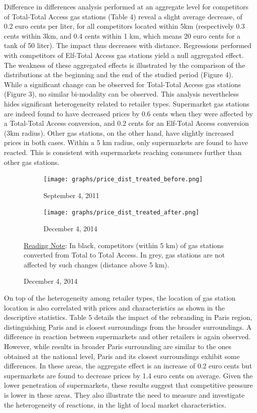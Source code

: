 \documentclass[english]{article}
\begin{document}
Difference in differences analysis performed at an aggregate level for competitors of Total-Total Access gas stations (Table 4) reveal a slight average decrease, of 0.2 euro cents per liter, for all competitors located within 5km (respectively 0.3 cents within 3km, and 0.4 cents within 1 km, which means 20 euro cents for a tank of 50 liter). The impact thus decreases with distance. Regressions performed with competitors of Elf-Total Access gas stations yield a null aggregated effect. The weakness of these aggregated effects is illustrated by the comparison of the distributions at the beginning and the end of the studied period (Figure 4). While a significant change can be observed for Total-Total Access gas stations (Figure 3), no similar bi-modality can be observed. This analysis nevertheless hides significant heterogeneity related to retailer types. Supermarket gas stations are indeed found to have decreased prices by 0.6 cents when they were affected by a Total-Total Access conversion, and 0.2 cents for an Elf-Total Access conversion (3km radius). Other gas stations, on the other hand, have slightly increased prices in both cases. Within a 5 km radius, only supermarkets are found to have reacted. This is consistent with supermarkets reaching consumers further than other gas stations.

\begin{figure}[htb!]
\centering
\caption{Distributions of Total Access competitor prices vs .others}
\label{fig:price_dist_total_comp_ba}
\begin{subfigure}{.49\textwidth}
\centering
\texttt{[image: graphs/price\_dist\_treated\_before.png]}
\caption[short]{September 4, 2011}
\end{subfigure}
\begin{subfigure}{.49\textwidth}
\centering
\texttt{[image: graphs/price\_dist\_treated\_after.png]}
\caption[short]{December 4, 2014}
\end{subfigure}
\flushleft
{\small{}\uline{Reading Note}}{\small{}: In black, competitors (within 5 km) of gas stations converted from Total to Total Access. In grey, gas stations are not affected by such changes (distance above 5 km).}{\small \par}
\end{figure}

On top of the heterogeneity among retailer types, the location of gas station location is also correlated with prices and characteristics as shown in the descriptive statistics. Table 5 details the impact of the rebranding in Paris region, distinguishing Paris and is closest surroundings from the broader surroundings. A difference in reaction between supermarkets and other retailers is again observed. However, while results in broader Paris surrounding are similar to the ones obtained at the national level, Paris and its closest surroundings exhibit some differences. In these areas, the aggregate effect is an increase of 0.2 euro cents but supermarkets are found to decrease prices by 1.4 euro cents on average. Given the lower penetration of supermarkets, these results suggest that competitive pressure is lower in these areas. They also illustrate the need to measure and investigate the heterogeneity of reactions, in the light of local market characteristics.
\end{document}
